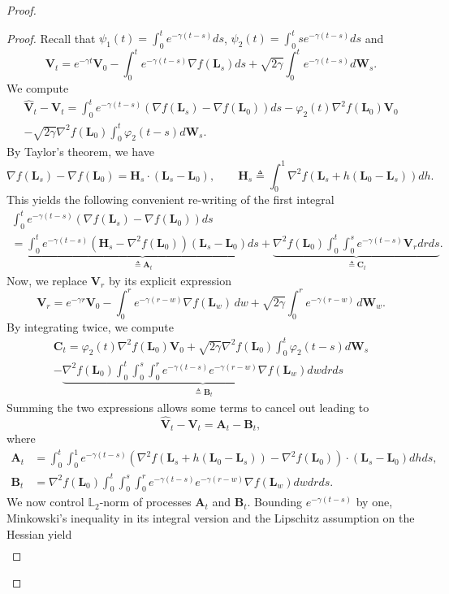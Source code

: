 \documentclass[a4paper,bej,preprint,reqno]{imsart}
\newcommand\bB{\boldsymbol B}
\newcommand\bfH{\mathbf H}
\newcommand\bL{\boldsymbol L}
\newcommand\bA{\boldsymbol A}
\newcommand\bC{\boldsymbol C}
\newcommand\bW{\boldsymbol W}
\newcommand\bV{\boldsymbol V}
\newcommand\LL{\mathbb L}
\def\hat{\widehat}
\begin{document}
\begin{proof}
\begin{proof}
Recall that $\psi_1(t)=\int_0^t e^{-\gamma(t-s)}ds$, $\psi_2(t)=\int_0^tse^{-\gamma(t-s)}ds$ and
$$
\bV_t=e^{-\gamma t} \bV_0-\int_0^t e^{-\gamma (t-s)}\nabla f(\bL_s)ds+\sqrt{2\gamma}\int_0^te^{-\gamma (t-s)}d\bW_s.
$$
We compute
\begin{multline}
\hat{\bV}_t-\bV_t=
\int_0^te^{-\gamma(t-s)}(\nabla f(\bL_s)-\nabla f(\bL_0))ds
-\varphi_2(t)\nabla^2f(\bL_0) \bV_0\\
-\sqrt{2\gamma}\nabla^2 f(\bL_0)\int_0^t\varphi_2(t-s)d\bW_s.
\end{multline}
 By Taylor's theorem, we have
 $$
 \nabla f(\bL_s)-\nabla f(\bL_0)=\bfH_s\cdot(\bL_s-\bL_0),\qquad\bfH_s\triangleq\int_0^1\nabla^2f(\bL_s+h(\bL_0-\bL_s))dh.
 $$
This yields the following convenient re-writing of the first integral
\begin{multline}
    \int_0^te^{-\gamma(t-s)}(\nabla f(\bL_s)-\nabla f(\bL_0))ds\\
    =\underbrace{\int_0^te^{-\gamma(t-s)}(\bfH_s-\nabla^2 f(\bL_0))(\bL_s-\bL_0)ds}_{\triangleq \bA_t}
    +\underbrace{\nabla^2 f(\bL_0)\int_0^t\int_0^se^{-\gamma(t-s)}\bV_r drds}_{\triangleq \bC_t}.
\end{multline}
Now, we replace $\bV_r$ by its explicit expression
$$
\bV_r
		= e^{-\gamma r}\bV_0 -  \int_0^r e^{-\gamma (r-w)} \nabla f(\bL_w)\,dw+
		\sqrt{2\gamma}\int_0^r e^{-\gamma (r-w)}\,d\bW_w.
$$
By integrating twice, we compute
\begin{multline}
    \bC_t= \varphi_2(t)\nabla^2f(\bL_0) \bV_0+\sqrt{2\gamma}\nabla^2 f(\bL_0)\int_0^t\varphi_2(t-s)d\bW_s\\-\underbrace{\nabla^2 f(\bL_0)\int_0^t\int_0^s\int_0^re^{-\gamma (t-s)}e^{-\gamma (r-w)}\nabla f(\bL_w)dwdrds}_{\triangleq \bB_t}
\end{multline}
Summing the two expressions allows some terms to cancel out leading to
$$
\hat{\bV}_t-\bV_t=\bA_t-\bB_t,
$$
where
\begin{align}
    \bA_t&=\int_0^t\int_0^1e^{-\gamma (t-s)}\left(\nabla^2f(\bL_s+h(\bL_0-\bL_s))-\nabla^2f(\bL_0)\right)\cdot(\bL_s-\bL_0)dhds,\\
   \bB_t&=\nabla^2 f(\bL_0)\int_0^t\int_0^s\int_0^re^{-\gamma (t-s)}e^{-\gamma (r-w)}\nabla f(\bL_w)dwdrds.
\end{align}
We now control ${\LL}_2$-norm of processes $\bA_t$ and $\bB_t$. Bounding $e^{-\gamma (t-s)}$ by one, Minkowski's inequality in its integral version and the Lipschitz assumption on the Hessian yield
\begin{align}

\end{align}
\end{proof}
\end{proof}
\end{document}
